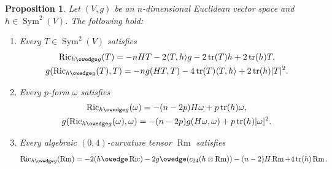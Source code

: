 \documentclass[pdftex]{sigma}
\numberwithin{equation}{section}
\newtheorem{Proposition}[Theorem]{Proposition}
{ \theoremstyle{definition}
\newtheorem{Remark}[Theorem]{Remark} }
\newcommand{\Ric} {\operatorname{Ric}}
\newcommand{ \tr } {\operatorname{tr}}
\newcommand{\Rm} {\operatorname{Rm}}
\newcommand{ \Sym } {\operatorname{Sym}}
\begin{document}
\begin{Proposition}\label{WeightedCurvatureTerm}
Let $(V,g)$ be an $n$-dimensional Euclidean vector space and $h \in \Sym^2(V)$. The following hold:
\begin{enumerate}\itemsep=0pt
\item[$1.$] Every $T \in \operatorname{Sym}^2(V)$ satisfies
\begin{gather*}
\Ric_{h \owedge g}(T)   = - n HT - 2 \langle T,h \rangle g-2 \tr(T)h + 2 \tr(h) T , \\
g(\Ric_{h \owedge g}(T),T)   = - n g(HT,T) -4 \tr(T) \langle T, h \rangle + 2 \tr(h) |T|^2.
\end{gather*}
\item[$2.$] Every $p$-form $\omega$ satisfies
\begin{gather*}
\Ric_{h \owedge g}(\omega)   = - (n-2p) H \omega + p \tr(h) \omega, \\
g(\Ric_{h \owedge g}(\omega), \omega)   = - (n-2p) g(H \omega, \omega) + p \tr(h) |\omega|^2.
\end{gather*}
\item[$3.$] Every algebraic $(0,4)$-curvature tensor $\Rm$ satisfies
\begin{gather*}
\Ric_{h \owedge g}(\Rm)  = -2  ( h \owedge \Ric  ) -2 g \owedge ( c_{24} ( h \otimes \Rm  ) ) -(n-2) H \Rm + 4 \tr(h) \Rm.
\end{gather*}
\end{enumerate}
\end{Proposition}
\end{document}
